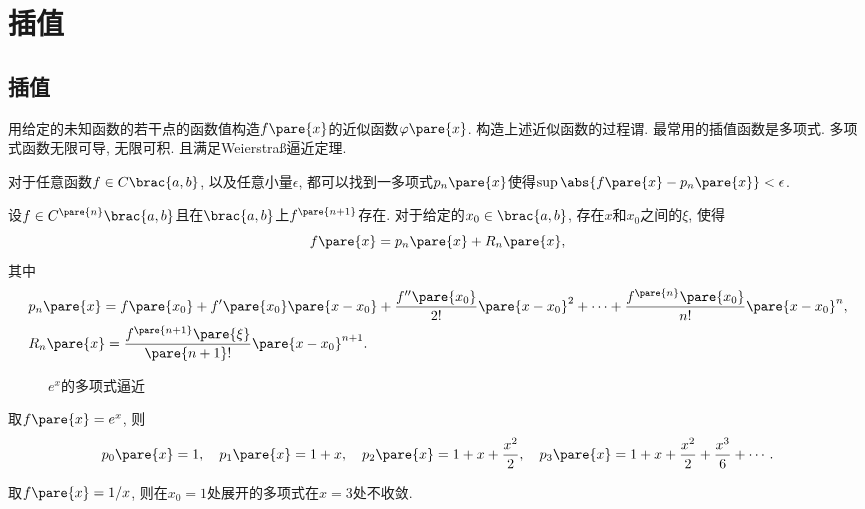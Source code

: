 \documentclass[hidelinks]{ctexart}
\begin{document}
\section{插值} %
\label{sec:插值}

\subsection{插值} %
\label{sub:插值}

\newpoint{}用给定的未知函数的若干点的函数值构造$f\pare{x}$的近似函数$\varphi\pare{x}$. 构造上述近似函数的过程谓. 最常用的插值函数是多项式.
\newpoint{}多项式函数无限可导, 无限可积.
\newpoint{}且满足Weierstra\ss 逼近定理.
\begin{theorem}
    对于任意函数$f\in C\brac{a,b}$, 以及任意小量$\epsilon$, 都可以找到一多项式$p_n\pare{x}$使得$\sup \abs{f\pare{x} - p_n\pare{x}} < \epsilon$.
\end{theorem}
\begin{theorem}[Taylor]
    设$f\in C^{\pare{n}}\brac{a,b}$且在$\brac{a,b}$上$f^{\pare{n+1}}$存在. 对于给定的$x_0 \in \brac{a,b}$, 存在$x$和$x_0$之间的$\xi$, 使得
    \[ f\pare{x} = p_n\pare{x} + R_n\pare{x}, \]
    其中
    \begin{align*}
    & p_n\pare{x} = f\pare{x_0} + f'\pare{x_0}\pare{x-x_0} + \frac{f''\pare{x_0}}{2!}\pare{x-x_0}^2 + \cdots + \frac{f^{\pare{n}}\pare{x_0}}{n!}\pare{x-x_0}^n,\\
    & R_n\pare{x} = \frac{f^{\pare{n+1}}\pare{\xi}}{\pare{n+1}!}\pare{x-x_0}^{n+1}.
    \end{align*}
\end{theorem}
\begin{figure}[ht]
    \centering
    \caption{$e^x$的多项式逼近}
\end{figure}
\begin{ex}
    取$f\pare{x} = e^x$, 则
    \[ p_0\pare{x} = 1,\quad p_1\pare{x} = 1+x,\quad p_2\pare{x} = 1+x+ \frac{x^2}{2},\quad p_3\pare{x} = 1+x+\frac{x^2}{2}+\frac{x^3}{6}+\cdots. \]
\end{ex}
\begin{ex}
    取$f\pare{x} = 1/x$, 则在$x_0 = 1$处展开的多项式在$x=3$处不收敛.
\end{ex}
\end{document}
